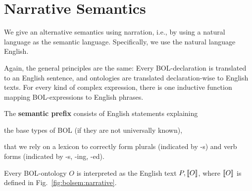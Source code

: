 \section{Narrative Semantics}\label{sec:bolsem:narr}

We give an alternative semantics using narration, i.e., by using a natural language as the semantic language.
Specifically, we use the natural language English.

Again, the general principles are the same:
Every BOL-declaration is translated to an English sentence, and ontologies are translated declaration-wise to English texts.
For every kind of complex expression, there is one inductive function mapping BOL-expressions to English phrases.

\begin{definition}\label{def:bolsem:eng}
The \textbf{semantic prefix} consists of English statements explaining
\begin{compactitem}
 \item the base types of BOL (if they are not universally known),
 \item that we rely on a lexicon to correctly form plurals (indicated by -s) and verb forms (indicated by -s, -ing, -ed).
\end{compactitem}

Every BOL-ontology $O$ is interpreted as the English text $P,\llbracket O\rrbracket$, where $\llbracket O\rrbracket$ is defined in Fig.~\ref{fig:bolsem:narrative}.
\end{definition}



